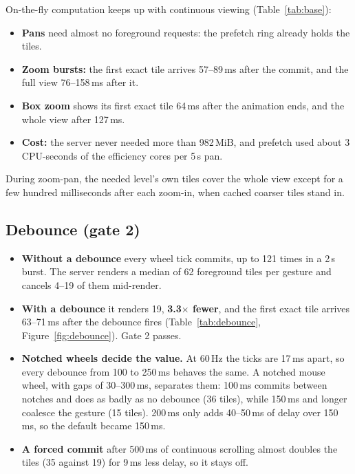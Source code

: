 \documentclass[11pt,a4paper]{article}
\begin{document}
On-the-fly computation keeps up with continuous viewing (Table~\ref{tab:base}):
\begin{itemize}
  \item \textbf{Pans} need almost no foreground requests: the prefetch ring already holds the tiles.
  \item \textbf{Zoom bursts:} the first exact tile arrives 57--89\,ms after the commit, and the full view 76--158\,ms
  after it.
  \item \textbf{Box zoom} shows its first exact tile 64\,ms after the animation ends, and the whole view after
  127\,ms.
  \item \textbf{Cost:} the server never needed more than 982\,MiB, and prefetch used about 3 CPU-seconds of the
  efficiency cores per 5\,s pan.
\end{itemize}
During zoom-pan, the needed level's own tiles cover the whole view except for a few hundred milliseconds after each
zoom-in, when cached coarser tiles stand in.

\subsection{Debounce (gate 2)}

\begin{itemize}
  \item \textbf{Without a debounce} every wheel tick commits, up to 121 times in a 2\,s burst. The server renders a
  median of 62 foreground tiles per gesture and cancels 4--19 of them mid-render.
  \item \textbf{With a debounce} it renders 19, \textbf{3.3$\times$ fewer}, and the first exact tile arrives
  63--71\,ms after the debounce fires (Table~\ref{tab:debounce}, Figure~\ref{fig:debounce}). Gate 2 passes.
  \item \textbf{Notched wheels decide the value.} At 60\,Hz the ticks are 17\,ms apart, so every debounce from 100
  to 250\,ms behaves the same. A notched mouse wheel, with gaps of 30--300\,ms, separates them: 100\,ms commits
  between notches and does as badly as no debounce (36 tiles), while 150\,ms and longer coalesce the gesture
  (15 tiles). 200\,ms only adds 40--50\,ms of delay over 150\,ms, so the default became 150\,ms.
  \item \textbf{A forced commit} after 500\,ms of continuous scrolling almost doubles the tiles (35 against 19) for
  9\,ms less delay, so it stays off.
\end{itemize}
\end{document}
